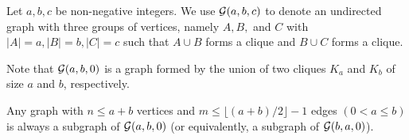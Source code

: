 \begin{definition}
Let $a,b,c$ be non-negative integers.  We use ${\cal G}(a,b,c)$ to denote an undirected graph with three groups of vertices,  namely $A, B,$ and $C$ with $|A| = a, |B|=b, |C|=c$ such that $A \cup B$ forms a clique and $B \cup C$ forms a clique.
\end{definition}

\noindent
Note that ${\cal G}(a,b,0)$ is a graph formed by the union of two cliques $K_a$ and $K_b$ of size $a$ and $b$, respectively.

\begin{theorem}
Any graph with $n \leq a + b$ vertices and $m \leq \lfloor (a+b)/2 \rfloor-1$ edges $(0<a \leq b)$ 
is always a subgraph of ${\cal G}(a,b,0)$ (or equivalently, a subgraph of ${\cal G}(b,a,0)$).
\end{theorem}

